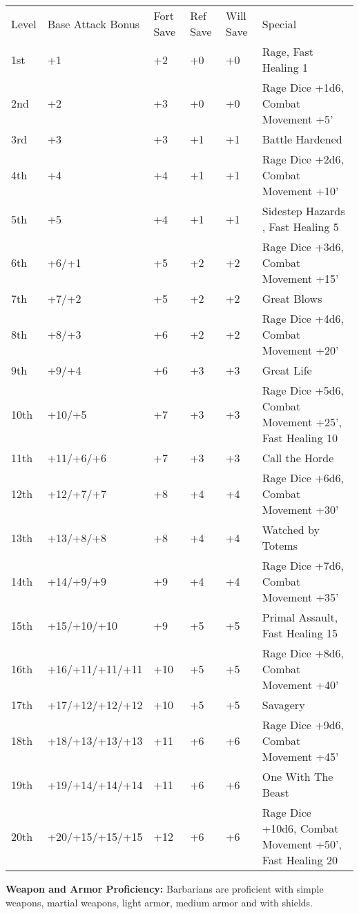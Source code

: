 \documentclass[10pt]{article}
\newcommand{\ability}[2]{\smallskip \noindent \textbf{#1} #2}
\begin{document}
\begin{table}[htb]
\begin{small}
\begin{tabular}{lp{3cm}p{0.7cm}p{0.7cm}p{0.7cm}l}
Level  &Base Attack Bonus &Fort Save &Ref Save &Will Save &Special\\
1st &+1 &+2 &+0 &+0 &Rage, Fast Healing 1\\
2nd &+2 &+3 &+0 &+0 &Rage Dice +1d6, Combat Movement +5'\\
3rd &+3 &+3 &+1 &+1 &Battle Hardened\\
4th &+4 &+4 &+1 &+1 &Rage Dice +2d6, Combat Movement +10'\\
5th &+5 &+4 &+1 &+1 &Sidestep Hazards , Fast Healing 5\\
6th &+6/+1 &+5 &+2 &+2 &Rage Dice +3d6, Combat Movement +15'\\
7th &+7/+2 &+5 &+2 &+2 &Great Blows\\
8th &+8/+3 &+6 &+2 &+2 &Rage Dice +4d6, Combat Movement +20'\\
9th &+9/+4 &+6 &+3 &+3 &Great Life\\
10th &+10/+5 &+7 &+3 &+3 &Rage Dice +5d6, Combat Movement +25', Fast Healing 10\\
11th &+11/+6/+6 &+7 &+3 &+3 &Call the Horde\\
12th &+12/+7/+7 &+8 &+4 &+4 &Rage Dice +6d6, Combat Movement +30'\\
13th &+13/+8/+8 &+8 &+4 &+4 &Watched by Totems\\
14th &+14/+9/+9 &+9 &+4 &+4 &Rage Dice +7d6, Combat Movement +35'\\
15th &+15/+10/+10 &+9 &+5 &+5 &Primal Assault, Fast Healing 15\\
16th &+16/+11/+11/+11 &+10 &+5 &+5 &Rage Dice +8d6, Combat Movement +40'\\
17th &+17/+12/+12/+12 &+10 &+5 &+5 &Savagery\\
18th &+18/+13/+13/+13 &+11 &+6 &+6 &Rage Dice +9d6, Combat Movement +45'\\
19th &+19/+14/+14/+14 &+11 &+6 &+6 &One With The Beast\\
20th &+20/+15/+15/+15 &+12 &+6 &+6 &Rage Dice +10d6, Combat Movement +50', Fast Healing 20\\
\end{tabular}
\end{small}
\end{table}




\ability{Weapon and Armor Proficiency:}{Barbarians are proficient with simple weapons, martial weapons, light armor, medium armor and with shields.}
\end{document}
